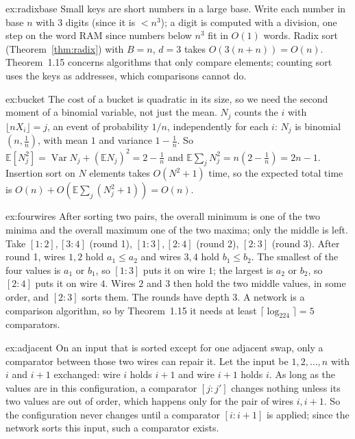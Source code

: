 \begin{solution}{ex:radixbase}
\idea Small keys are short numbers in a large base.
\writeup Write each number in base $n$ with $3$ digits (since it is $<n^3$); a digit is computed with a division, one step on the word RAM since numbers below $n^3$ fit in $O(1)$ words. Radix sort
(Theorem~\ref{thm:radix}) with $B=n$, $d=3$ takes $O(3(n+n))=O(n)$. Theorem~1.15 concerns algorithms that only compare elements; counting sort uses the keys as addresses, which comparisons cannot do.
\end{solution}

\begin{solution}{ex:bucket}
\idea The cost of a bucket is quadratic in its size, so we need the second moment of a binomial variable, not just the mean.
\writeup $N_j$ counts the $i$ with $\lfloor nX_i\rfloor=j$, an event of probability $1/n$, independently for each $i$: $N_j$ is binomial$(n,\frac1n)$, with mean $1$ and variance $1-\frac1n$. So
$\mathbb E[N_j^2]=\operatorname{Var}N_j+(\mathbb EN_j)^2=2-\frac1n$ and $\mathbb E\sum_jN_j^2=n(2-\frac1n)=2n-1$. Insertion sort on $N$ elements takes $O(N^2+1)$ time, so the expected total time is
$O(n)+O(\mathbb E\sum_j(N_j^2+1))=O(n)$.
\end{solution}

\begin{solution}{ex:fourwires}
\idea After sorting two pairs, the overall minimum is one of the two minima and the overall maximum one of the two maxima; only the middle is left.
\writeup Take $[1:2],[3:4]$ (round 1), $[1:3],[2:4]$ (round 2), $[2:3]$ (round 3). After round 1, wires $1,2$ hold $a_1\le a_2$ and wires $3,4$ hold $b_1\le b_2$. The smallest of the four values is
$a_1$ or $b_1$, so $[1:3]$ puts it on wire $1$; the largest is $a_2$ or $b_2$, so $[2:4]$ puts it on wire $4$. Wires $2$ and $3$ then hold the two middle values, in some order, and $[2:3]$ sorts them.
The rounds have depth $3$. A network is a comparison algorithm, so by Theorem~1.15 it needs at least $\lceil\log_224\rceil=5$ comparators.
\end{solution}

\begin{solution}{ex:adjacent}
\idea On an input that is sorted except for one adjacent swap, only a comparator between those two wires can repair it.
\writeup Let the input be $1,2,\dots,n$ with $i$ and $i+1$ exchanged: wire $i$ holds $i+1$ and wire $i+1$ holds $i$. As long as the values are in this configuration, a comparator $[j:j']$ changes
nothing unless its two values are out of order, which happens only for the pair of wires $i,i+1$. So the configuration never changes until a comparator $[i:i+1]$ is applied; since the
network sorts this input, such a comparator exists.
\end{solution}

